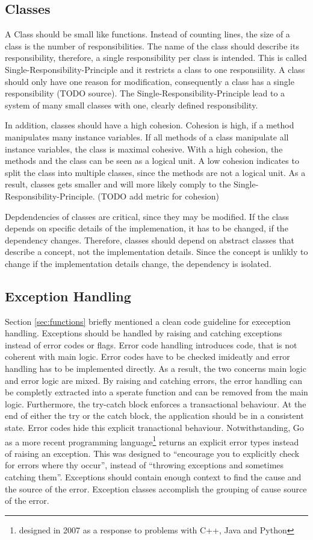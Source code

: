 \subsection{Classes}
A Class should be small like functions. Instead of counting lines, the size of a class is the number of responsibilities. The name of the class should describe its responsibility, therefore, a single responsibility per class is intended. This is called Single-Responsibility-Principle and it restricts a class to one responsiility. A class should only have one reason for modification, consequently a class has a single responsibility (TODO source). The Single-Responsibility-Principle lead to a system of many small classes with one, clearly defined responsibility.

In addition, classes should have a high cohesion. Cohesion is high, if a method manipulates many instance variables. If all methods of a class manipulate all instance variables, the class is maximal cohesive. With a high cohesion, the methods and the class can be seen as a logical unit. A low cohesion indicates to split the class into multiple classes, since the methods are not a logical unit. As a result, classes gets smaller and will more likely comply to the Single-Responsibility-Principle. (TODO add metric for cohesion)

Depdendencies of classes are critical, since they may be modified. If the class depends on specific details of the implemenation, it has to be changed, if the dependency changes. Therefore, classes should depend on abstract classes that describe a concept, not the implementation details. Since the concept is unlikly to change if the implementation details change, the dependency is isolated. 

\subsection{Exception Handling}
Section \ref{sec:functions} briefly mentioned a clean code guideline for exeception handling. Exceptions should be handled by raising and catching exceptions instead of error codes or flags. Error code handling introduces code, that is not coherent with main logic. Error codes have to be checked imideatly and error handling has to be implemented directly. As a result, the two concerns main logic and error logic are mixed. By raising and catching errors, the error handling can be completly extracted into a sperate function and can be removed from the main logic. Furthermore, the try-catch block enforces a transactional behaviour. At the end of either the try or the catch block, the application should be in a consistent state. Error codes hide this explicit tranactional behaviour. Notwithstanding, Go as a more recent programming language\footnote{designed in 2007 as a response to problems with C++, Java and Python\cite{noauthor_go_nodate}} returns an explicit error types instead of raising an exception. This was designed to \enquote{encourage you to explicitly check for errors where thy occur}, instead of \enquote{throwing exceptions and sometimes catching them}\cite{gerrand_error_2011}.   
Exceptions should contain enough context to find the cause and the source of the error. Exception classes accomplish the grouping of cause source of the error. 

